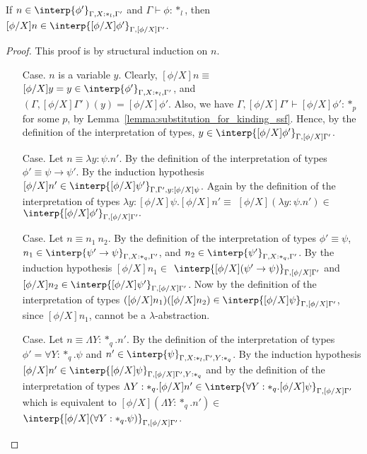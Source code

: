 \begin{lemma}
  If $n \in \interp{\phi'}_{\Gamma,X:*_l,\Gamma'}$ and 
  $\Gamma \vdash \phi:*_l$, then 
  $[\phi/X]n \in \interp{[\phi/X]\phi'}_{\Gamma,[\phi/X]\Gamma'}$.
  \label{lemma:type_sub_ssf}
\end{lemma}
\begin{proof}
  This proof is by structural induction on $n$.
\begin{itemize}
\item[Case.] $n$ is a variable $y$.  Clearly, $[\phi/X]n \equiv $
  $[\phi/X]y = y \in \interp{\phi'}_{\Gamma,X:*_l,\Gamma'}$, and\\
  $(\Gamma,[\phi/X]\Gamma')(y) = [\phi/X]\phi'$. Also,
  we have $\Gamma,[\phi/X]\Gamma' \vdash [\phi/X]\phi':*_p$ for some $p$, by 
  Lemma~\ref{lemma:substitution_for_kinding_ssf}. Hence,
  by the definition of the interpretation of types, 
  $y \in \interp{[\phi/X]\phi'}_{\Gamma,[\phi/X]\Gamma'}$.
  
\item[Case.] Let $n \equiv \lambda y:\psi.n'$.  By the definition of the
  interpretation of types $\phi' \equiv \psi \rightarrow \psi'$.  
  By the induction hypothesis 
  $[\phi/X]n' \in \interp{[\phi/X]\psi'}_{\Gamma,\Gamma',y:[\phi/X]\psi}$. 
  Again by the definition of the interpretation of types
  $\lambda y:[\phi/X]\psi.[\phi/X]n' \equiv $
  $[\phi/X](\lambda y:\psi.n') \in $
  $\interp{[\phi/X]\phi'}_{\Gamma,[\phi/X]\Gamma'}.$
  
\item[Case.]  Let $n \equiv n_1\ n_2$.  By the definition of the 
  interpretation of types $\phi' \equiv \psi$, 
  $n_1 \in \interp{\psi' \rightarrow \psi}_{\Gamma,X:*_q,\Gamma'}$, and
  $n_2 \in \interp{\psi'}_{\Gamma,X:*_q,\Gamma'}$.  By the induction hypothesis 
  $[\phi/X]n_1 \in $
  $\interp{[\phi/X](\psi' \rightarrow \psi)}_{\Gamma,[\phi/X]\Gamma'}$ and
  $[\phi/X]n_2 \in \interp{[\phi/X]\psi'}_{\Gamma,[\phi/X]\Gamma'}$.  Now by
  the definition of the interpretation of types 
  $([\phi/X]n_1)([\phi/X]n_2) \in \interp{[\phi/X]\psi}_{\Gamma,[\phi/X]\Gamma'}$,
  since $[\phi/X]n_1$, cannot be a $\lambda$-abstraction.
  
\item[Case.]  Let $n \equiv \Lambda Y:*_q.n'$.  By the definition of the
  interpretation of types $\phi' = \forall Y:*_q.\psi$ and 
  $n' \in \interp{\psi}_{\Gamma,X:*_l,\Gamma',Y:*_q}$.  By the induction 
  hypothesis \\
  $[\phi/X]n' \in \interp{[\phi/X]\psi}_{\Gamma,[\phi/X]\Gamma',Y:*_q}$ and by
  the definition of the interpretation of types 
  $\Lambda Y:*_q.[\phi/X]n' \in 
  \interp{\forall Y:*_q.[\phi/X]\psi}_{\Gamma,[\phi/X]\Gamma'}$ which is 
  equivalent to
  $[\phi/X](\Lambda Y:*_q.n') \in $
  $\interp{[\phi/X](\forall Y:*_q.\psi)}_{\Gamma,[\phi/X]\Gamma'}$.
  

\end{itemize}
\end{proof}
